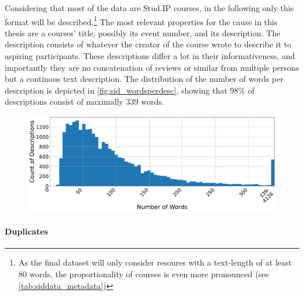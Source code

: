 Considering that most of the data are Stud.IP courses, in the following only this format will be described.\footnote{As the final dataset will only consider resoures with a text-length of at least 80 words, the proportionality of courses is even more pronounced (see \autoref{tab:siddata_metadata})} The most relevant properties for the cause in this thesis are a courses' title, possibly its event number, and its description. The description consists of whatever the creator of the course wrote to describe it to aspiring participants. These descriptions differ a lot in their informativeness, and importantly they are no concatenation of reviews or similar from multiple persons but a continous text description. The distribution of the number of words per description is depicted in \autoref{fig:sid_wordsperdesc}, showing that 98\% of descriptions consist of maximally 339 words.


\begin{figure}[h]
	\centering
	\includegraphics[width=\textwidth]{graphics/dataset_new/words_per_desc.pdf}
	\label{fig:sid_wordsperdesc}
\end{figure}

\paragraph{Duplicates}

